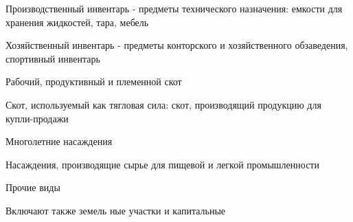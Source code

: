 Производственный инвентарь - предметы технического назначения: емкости для
хранения жидкостей, тара, мебель

Хозяйственный инвентарь - предметы конторского и хозяйственного обзаведения,
спортивный инвентарь

Рабочий, продуктивный и племенной скот

Скот, используемый как тягловая сила: скот, производящий продукцию для
купли-продажи

Многолетние насаждения

Насаждения, производящие сырье для пищевой и легкой промышленности

Прочие виды

Включают также земель ные участки и капитальные

